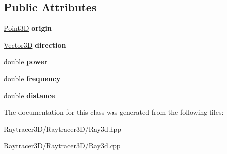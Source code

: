 \subsection*{Public Attributes}
\begin{DoxyCompactItemize}
\item 
\hypertarget{class_ray3_d_aa303389d0d8e8569f4bdef420e850717}{}\label{class_ray3_d_aa303389d0d8e8569f4bdef420e850717} 
\hyperlink{class_point3_d}{Point3D} {\bfseries origin}
\item 
\hypertarget{class_ray3_d_a1b9fbe26d23a38f12be002d0e5990fd2}{}\label{class_ray3_d_a1b9fbe26d23a38f12be002d0e5990fd2} 
\hyperlink{class_vector3_d}{Vector3D} {\bfseries direction}
\item 
\hypertarget{class_ray3_d_adbe652ae6043219a7a6d22c3e6a454db}{}\label{class_ray3_d_adbe652ae6043219a7a6d22c3e6a454db} 
double {\bfseries power}
\item 
\hypertarget{class_ray3_d_a5be97a26ac4f733fee0b9a10ca78197a}{}\label{class_ray3_d_a5be97a26ac4f733fee0b9a10ca78197a} 
double {\bfseries frequency}
\item 
\hypertarget{class_ray3_d_a1287339cd3f7358590b2fb65dbb88505}{}\label{class_ray3_d_a1287339cd3f7358590b2fb65dbb88505} 
double {\bfseries distance}
\end{DoxyCompactItemize}


The documentation for this class was generated from the following files\+:\begin{DoxyCompactItemize}
\item 
Raytracer3\+D/\+Raytracer3\+D/Ray3d.\+hpp\item 
Raytracer3\+D/\+Raytracer3\+D/Ray3d.\+cpp\end{DoxyCompactItemize}
